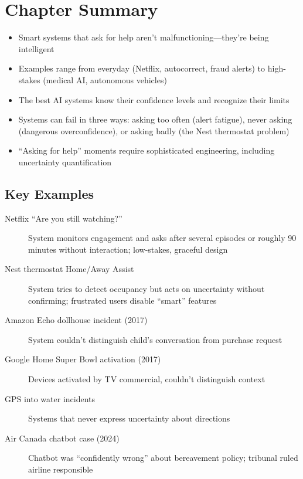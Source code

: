 \section*{Chapter Summary}

\begin{keyconcept}
\begin{itemize}
    \item Smart systems that ask for help aren't malfunctioning---they're being intelligent
    \item Examples range from everyday (Netflix, autocorrect, fraud alerts) to high-stakes (medical AI, autonomous vehicles)
    \item The best AI systems know their confidence levels and recognize their limits
    \item Systems can fail in three ways: asking too often (alert fatigue), never asking (dangerous overconfidence), or asking badly (the Nest thermostat problem)
    \item ``Asking for help'' moments require sophisticated engineering, including uncertainty quantification
\end{itemize}
\end{keyconcept}

\subsection*{Key Examples}

\begin{description}
    \item[Netflix ``Are you still watching?''] System monitors engagement and asks after several episodes or roughly 90 minutes without interaction; low-stakes, graceful design
    \item[Nest thermostat Home/Away Assist] System tries to detect occupancy but acts on uncertainty without confirming; frustrated users disable ``smart'' features
    \item[Amazon Echo dollhouse incident (2017)] System couldn't distinguish child's conversation from purchase request
    \item[Google Home Super Bowl activation (2017)] Devices activated by TV commercial, couldn't distinguish context
    \item[GPS into water incidents] Systems that never express uncertainty about directions
    \item[Air Canada chatbot case (2024)] Chatbot was ``confidently wrong'' about bereavement policy; tribunal ruled airline responsible
\end{description}


